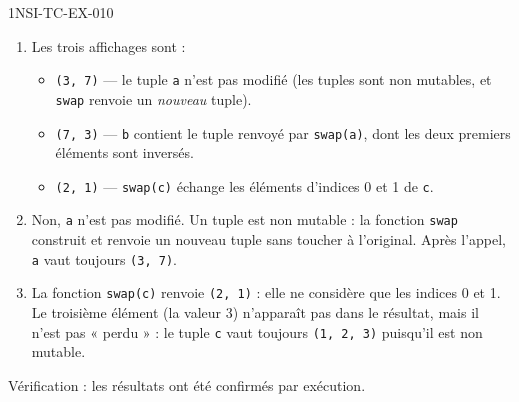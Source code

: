 \begin{corrige}{1NSI-TC-EX-010}
\begin{enumerate}
  \item Les trois affichages sont :
  \begin{itemize}
    \item \lstinline{(3, 7)} --- le tuple \lstinline{a} n'est pas modifié (les tuples sont non mutables, et \lstinline{swap} renvoie un \emph{nouveau} tuple).
    \item \lstinline{(7, 3)} --- \lstinline{b} contient le tuple renvoyé par \lstinline{swap(a)}, dont les deux premiers éléments sont inversés.
    \item \lstinline{(2, 1)} --- \lstinline{swap(c)} échange les éléments d'indices 0 et 1 de \lstinline{c}.
  \end{itemize}

  \item Non, \lstinline{a} n'est pas modifié. Un tuple est non mutable : la fonction \lstinline{swap} construit et renvoie un nouveau tuple sans toucher à l'original. Après l'appel, \lstinline{a} vaut toujours \lstinline{(3, 7)}.

  \item La fonction \lstinline{swap(c)} renvoie \lstinline{(2, 1)} : elle ne considère que les indices 0 et 1. Le troisième élément (la valeur 3) n'apparaît pas dans le résultat, mais il n'est pas « perdu » : le tuple \lstinline{c} vaut toujours \lstinline{(1, 2, 3)} puisqu'il est non mutable.
\end{enumerate}

Vérification : les résultats ont été confirmés par exécution.
\end{corrige}

